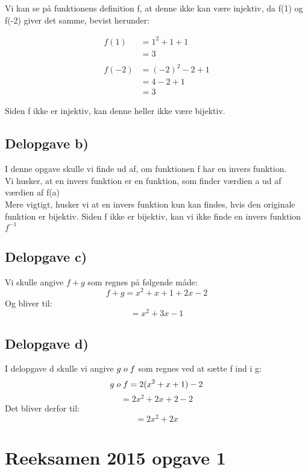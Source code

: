 \documentclass{article}
\begin{document}
Vi kan se på funktionens definition f, at denne ikke kan være injektiv, da f(1) og f(-2) giver det samme, bevist herunder:

\begin{equation}
    \begin{aligned}
        f(1) & = 1^2 + 1 + 1 \\
        & = 3 \\ \\
        f(-2) &= (-2)^2 - 2 + 1 \\
        & = 4 - 2 + 1 \\
        & = 3
    \end{aligned}
\end{equation}

Siden f ikke er injektiv, kan denne heller ikke være bijektiv.

\subsection{Delopgave b)}

I denne opgave skulle vi finde ud af, om funktionen f har en invers funktion. \\
Vi husker, at en invers funktion er en funktion, som finder værdien a ud af værdien af f(a) \\
Mere vigtigt, husker vi at en invers funktion kun kan findes, hvis den originale funktion er bijektiv. Siden f ikke er bijektiv, kan vi ikke finde en invers funktion $f^{-1}$
\subsection{Delopgave c)}
Vi skulle angive $f+g$ som regnes på følgende måde:
\[ f+g=x^2+x+1+2x-2\]
Og bliver til:
\[ =x^2+3x-1 \]

\subsection{Delopgave d)}
I delopgave d skulle vi angive $g \hspace{1mm} o \hspace{1mm} f$ som regnes ved at sætte f ind i g:
\[g \hspace{1mm} o \hspace{1mm} f=2(x^2+x+1)-2\]
\[=2x^2+2x+2-2\]
Det bliver derfor til:
\[=2x^2+2x\]

\section{Reeksamen 2015 opgave 1}
\end{document}
